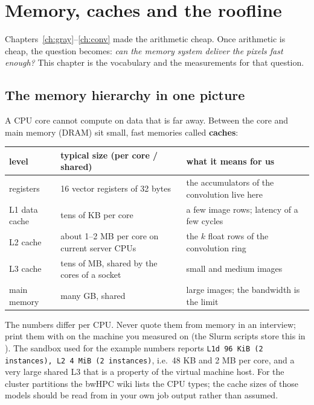 \chapter{Memory, caches and the roofline}\label{ch:cache}

Chapters~\ref{ch:gray}--\ref{ch:conv} made the arithmetic cheap. Once arithmetic is cheap, the question becomes: \emph{can the memory system deliver the pixels fast enough?} This chapter is the vocabulary and the measurements for that question.

\section{The memory hierarchy in one picture}

A CPU core cannot compute on data that is far away. Between the core and main memory (DRAM) sit small, fast memories called \textbf{caches}:

\begin{center}
\begin{tabular}{@{}lll@{}}
\toprule
level & typical size (per core / shared) & what it means for us\\
\midrule
registers & 16 vector registers of 32 bytes & the accumulators of the convolution live here\\
L1 data cache & tens of KB per core & a few image rows; latency of a few cycles\\
L2 cache & about 1--2 MB per core on current server CPUs & the $k$ float rows of the convolution ring\\
L3 cache & tens of MB, shared by the cores of a socket & small and medium images\\
main memory & many GB, shared & large images; the bandwidth is the limit\\
\bottomrule
\end{tabular}
\end{center}

The numbers differ per CPU. Never quote them from memory in an interview; print them with  on the machine you measured on (the Slurm scripts store this in ). The sandbox used for the example numbers reports \texttt{L1d 96 KiB (2 instances), L2 4 MiB (2 instances)}, i.e.\ 48 KB and 2 MB per core, and a very large shared L3 that is a property of the virtual machine host. For the cluster partitions the bwHPC wiki lists the CPU types; the cache sizes of those models should be read from  in your own job output rather than assumed.

